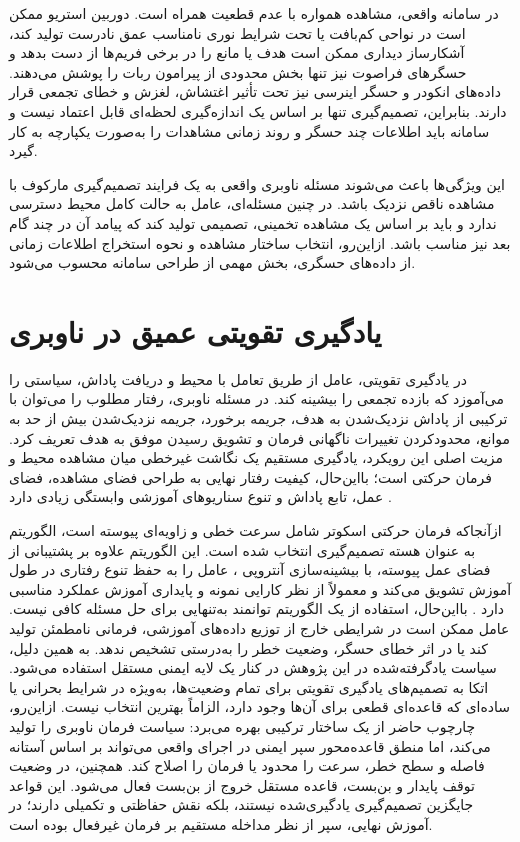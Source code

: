 در سامانه واقعی، مشاهده همواره با عدم قطعیت همراه است. دوربین استریو ممکن است در نواحی کم‌بافت یا تحت شرایط نوری نامناسب عمق نادرست تولید کند، آشکارساز دیداری ممکن است هدف یا مانع را در برخی فریم‌ها از دست بدهد و حسگرهای فراصوت نیز تنها بخش محدودی از پیرامون ربات را پوشش می‌دهند. داده‌های انکودر و حسگر اینرسی نیز تحت تأثیر اغتشاش، لغزش و خطای تجمعی قرار دارند. بنابراین، تصمیم‌گیری تنها بر اساس یک اندازه‌گیری لحظه‌ای قابل اعتماد نیست و سامانه باید اطلاعات چند حسگر و روند زمانی مشاهدات را به‌صورت یکپارچه به کار گیرد.

این ویژگی‌ها باعث می‌شوند مسئله ناوبری واقعی به یک فرایند تصمیم‌گیری مارکوف با مشاهده ناقص%
 نزدیک باشد. در چنین مسئله‌ای، عامل به حالت کامل محیط دسترسی ندارد و باید بر اساس یک مشاهده تخمینی، تصمیمی تولید کند که پیامد آن در چند گام بعد نیز مناسب باشد. ازاین‌رو، انتخاب ساختار مشاهده و نحوه استخراج اطلاعات زمانی از داده‌های حسگری، بخش مهمی از طراحی سامانه محسوب می‌شود.

\section{یادگیری تقویتی عمیق در ناوبری}

در یادگیری تقویتی، عامل از طریق تعامل با محیط و دریافت پاداش، سیاستی را می‌آموزد که بازده تجمعی را بیشینه کند. در مسئله ناوبری، رفتار مطلوب را می‌توان با ترکیبی از پاداش نزدیک‌شدن به هدف، جریمه برخورد، جریمه نزدیک‌شدن بیش از حد به موانع، محدودکردن تغییرات ناگهانی فرمان و تشویق رسیدن موفق به هدف تعریف کرد. مزیت اصلی این رویکرد، یادگیری مستقیم یک نگاشت غیرخطی میان مشاهده محیط و فرمان حرکتی است؛ بااین‌حال، کیفیت رفتار نهایی به طراحی فضای مشاهده، فضای عمل، تابع پاداش و تنوع سناریوهای آموزشی وابستگی زیادی دارد \cite{Kober2013RLRobotics,Le2024DRLNavigationSurvey}.

ازآنجاکه فرمان حرکتی اسکوتر شامل سرعت خطی و زاویه‌ای پیوسته است، الگوریتم  به عنوان هسته تصمیم‌گیری انتخاب شده است. این الگوریتم علاوه بر پشتیبانی از فضای عمل پیوسته، با بیشینه‌سازی آنتروپی%
، عامل را به حفظ تنوع رفتاری در طول آموزش تشویق می‌کند و معمولاً از نظر کارایی نمونه و پایداری آموزش عملکرد مناسبی دارد \cite{Haarnoja2018SAC}. بااین‌حال، استفاده از یک الگوریتم توانمند به‌تنهایی برای حل مسئله کافی نیست. %
عامل ممکن است در شرایطی خارج از توزیع داده‌های آموزشی، فرمانی نامطمئن تولید کند یا در اثر خطای حسگر، وضعیت خطر را به‌درستی تشخیص ندهد. به همین دلیل، سیاست یادگرفته‌شده در این پژوهش در کنار یک لایه ایمنی مستقل استفاده می‌شود.
اتکا به تصمیم‌های یادگیری تقویتی برای تمام وضعیت‌ها، به‌ویژه در شرایط بحرانی یا ساده‌ای که قاعده‌ای قطعی برای آن‌ها وجود دارد، الزاماً بهترین انتخاب نیست. ازاین‌رو، چارچوب حاضر از یک ساختار ترکیبی بهره می‌برد: سیاست  فرمان ناوبری را تولید می‌کند، اما منطق قاعده‌محور سپر ایمنی در اجرای واقعی می‌تواند بر اساس آستانه فاصله و سطح خطر، سرعت را محدود یا فرمان را اصلاح کند. همچنین، در وضعیت توقف پایدار و بن‌بست، قاعده مستقل خروج از بن‌بست فعال می‌شود. این قواعد جایگزین تصمیم‌گیری یادگیری‌شده نیستند، بلکه نقش حفاظتی و تکمیلی دارند؛ در آموزش نهایی، سپر از نظر مداخله مستقیم بر فرمان غیرفعال بوده است.


